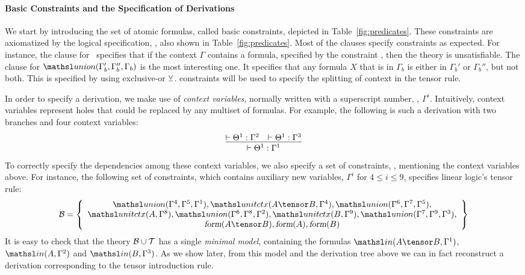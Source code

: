 \paragraph{Basic Constraints and the Specification of Derivations}
We start by introducing the set of atomic formulas, called basic
constraints, depicted in Table~\ref{fig:predicates}. These 
constraints are axiomatized by the logical specification, \thSeq, also
shown in Table~\ref{fig:predicates}. Most of the clauses specify
constraints as expected.
For instance, the clause for \emp{\Gamma}\ specifies that
if the context $\Gamma$ contains a formula, specified by the constraint
, then the theory is unsatisfiable. The clause for
$\union{\Gamma_b'}{\Gamma_b''}{\Gamma_b}$ is the most interesting one. It
specifies that any formula $X$ that is in $\Gamma_b$ is either in
$\Gamma_b'$ or $\Gamma_b''$, but not both. This is specified by using
exclusive-or $\veebar$.  constraints will be used to specify the
splitting of context in the tensor rule. 

In order to specify a derivation, we make use of \emph{context variables},
normally written with a superscript number, \eg, $\Gamma^i$. Intuitively,
context variables represent holes that could be replaced by 
any multiset of formulas. For example, the following
is such a derivation with two branches and four context variables:
{\small
\[
\infer{\vdash \Theta^1 : \Gamma^1 }
{
{\vdash \Theta^1 : \Gamma^2  }
&
{\vdash \Theta^1 : \Gamma^3  }
}
\]
}
To correctly specify the dependencies
among these context variables, we also specify a set of constraints,
\groundSet, mentioning the context variables above.
For instance, the following set of constraints, which
contains auxiliary new variables, $\Gamma^{i}$ for $4 \leq i \leq 9$,
specifies linear logic's tensor rule:
{\small
\[
\groundSet = \left\{
\begin{array}{c}
\union{\Gamma^4}{\Gamma^5}{\Gamma^1},
\elin{A \tensor B}{\Gamma^4}, \union{\Gamma^6}{\Gamma^7}{\Gamma^5}, \\
\elin{A}{\Gamma^8}, \union{\Gamma^6}{\Gamma^8}{\Gamma^2},
\elin{B}{\Gamma^9}, \union{\Gamma^7}{\Gamma^9}{\Gamma^3}, \\
\form{A \tensor B}, \form{A}, \form{B}
\end{array}\right\}
\]
}
It is easy to check that the theory $\mathcal{B} \cup {\cal T}$ has a single
\emph{minimal model}, containing the formulas $\In{A \tensor B}{\Gamma^1}$,
$\In{A}{\Gamma^2}$ and $\In{B}{\Gamma^3}$. As we show later, from this
model and the derivation tree above we can in fact reconstruct a
derivation corresponding to the tensor introduction rule. 

